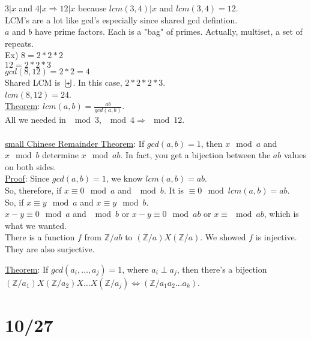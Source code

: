 \documentclass[13pt]{article}
\begin{document}
		$3 | x$ and $4 | x \Rightarrow 12 |x$ because $lcm(3,4)|x$ and 
		$lcm(3,4) = 12$. \\
		LCM's are a lot like gcd's especially since shared gcd defintion.\\
		$a$ and $b$ have prime factors. Each is a "bag" of primes. Actually,
		multiset, a set of repeats.\\
		Ex) $8 = 2*2*2$\\
		$12 = 2*2*3$\\
		$gcd(8, 12) = 2*2 = 4$\\
		Shared LCM is $\biguplus$. In this case, $2*2*2*3$.\\
		$lcm(8,12) = 24$.\\
		\underline{Theorem}: $lcm(a,b) = \frac{ab}{gcd(a,b)}$.\\
		All we needed in $\mod 3$, $\mod 4 \Rightarrow \mod 12$.\\\\
		\underline{small Chinese Remainder Theorem}: If $gcd(a,b) = 1$, then
		$x \mod a$ and $x \mod b$ determine $x \mod ab$. In fact, you get
		a bijection between the $ab$ values on both sides.\\
		\underline{Proof}: Since $gcd(a,b) = 1$, we know $lcm(a,b) = ab$.\\
		So, therefore, if $x \equiv 0 \mod a$ and $\mod b$. It is $\equiv 0 \mod
		lcm(a,b) = ab$.\\
		So, if $x \equiv y \mod a$ and $x \equiv y \mod b$.\\
		$x - y \equiv 0 \mod a$ and $\mod b$ or $ x - y \equiv 0 \mod ab$ or
		$x \equiv \mod ab$, which is what we wanted.\\
		There is a function $f$ from $\mathbb{Z} / ab$ to $(\mathbb{Z} / a) X
		(\mathbb{Z} / a)$. We showed $f$ is injective. They are also surjective.

	\underline{Theorem}: If $gcd(a_i, \ldots, a_j) = 1$, where $a_i \perp
	a_j$, then there's a bijection $(\mathbb{Z}/a_1) X (\mathbb{Z}/a_2) X
	\ldots X (\mathbb{Z}/a_j) \Leftrightarrow (\mathbb{Z}/a_1a_2\ldots a_k)$.

\section*{10/27}
\end{document}
